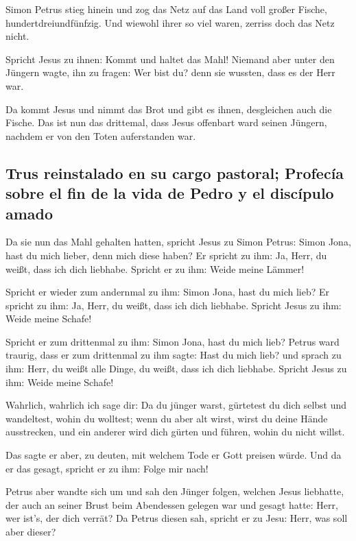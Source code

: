  Simon Petrus stieg hinein und zog das Netz auf das Land
voll großer Fische, hundertdreiundfünfzig. Und wiewohl ihrer so viel
waren, zerriss doch das Netz nicht.

 Spricht Jesus zu ihnen: Kommt und haltet das Mahl!
Niemand aber unter den Jüngern wagte, ihn zu fragen: Wer bist du? denn
sie wussten, dass es der Herr war.

 Da kommt Jesus und nimmt das Brot und gibt es ihnen,
desgleichen auch die Fische.  Das ist nun das drittemal,
dass Jesus offenbart ward seinen Jüngern, nachdem er von den Toten
auferstanden war.

\hypertarget{trus-reinstalado-en-su-cargo-pastoral-profecuxeda-sobre-el-fin-de-la-vida-de-pedro-y-el-discuxedpulo-amado}{%
\subsection{Trus reinstalado en su cargo pastoral; Profecía sobre el fin
de la vida de Pedro y el discípulo
amado}\label{trus-reinstalado-en-su-cargo-pastoral-profecuxeda-sobre-el-fin-de-la-vida-de-pedro-y-el-discuxedpulo-amado}}

 Da sie nun das Mahl gehalten hatten, spricht Jesus zu
Simon Petrus: Simon Jona, hast du mich lieber, denn mich diese haben? Er
spricht zu ihm: Ja, Herr, du weißt, dass ich dich liebhabe. Spricht er
zu ihm: Weide meine Lämmer!

 Spricht er wieder zum andernmal zu ihm: Simon Jona, hast
du mich lieb? Er spricht zu ihm: Ja, Herr, du weißt, dass ich dich
liebhabe. Spricht Jesus zu ihm: Weide meine Schafe!

 Spricht er zum drittenmal zu ihm: Simon Jona, hast du
mich lieb? Petrus ward traurig, dass er zum drittenmal zu ihm sagte:
Hast du mich lieb? und sprach zu ihm: Herr, du weißt alle Dinge, du
weißt, dass ich dich liebhabe. Spricht Jesus zu ihm: Weide meine Schafe!

 Wahrlich, wahrlich ich sage dir: Da du jünger warst,
gürtetest du dich selbst und wandeltest, wohin du wolltest; wenn du aber
alt wirst, wirst du deine Hände ausstrecken, und ein anderer wird dich
gürten und führen, wohin du nicht willst.

 Das sagte er aber, zu deuten, mit welchem Tode er Gott
preisen würde. Und da er das gesagt, spricht er zu ihm: Folge mir nach!

 Petrus aber wandte sich um und sah den Jünger folgen,
welchen Jesus liebhatte, der auch an seiner Brust beim Abendessen
gelegen war und gesagt hatte: Herr, wer ist's, der dich verrät?
 Da Petrus diesen sah, spricht er zu Jesu: Herr, was soll
aber dieser?

